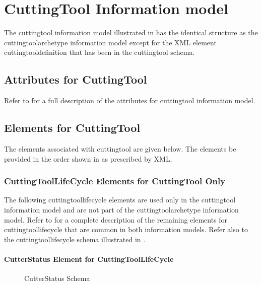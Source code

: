 \section{CuttingTool Information model}
The \gls{cuttingtool} \gls{information model} illustrated in  has the identical structure as the \gls{cuttingtoolarchetype} \gls{information model} except for the XML element \gls{cuttingtooldefinition} that has been \DEPRECATED in the \gls{cuttingtool} schema.

\subsection{Attributes for CuttingTool}
Refer to  for a full description of the \glspl{attribute} for \gls{cuttingtool} \gls{information model}.

\subsection{Elements for CuttingTool}
The elements associated with \gls{cuttingtool} are given below.    The elements \MUST be provided in the order shown in  as prescribed by XML.



\subsubsection{CuttingToolLifeCycle Elements for CuttingTool Only}

The following \gls{cuttingtoollifecycle} elements are used only in the \gls{cuttingtool} \gls{information model} and are not part of the \gls{cuttingtoolarchetype} \gls{information model}. Refer to  for a complete description of the remaining elements for \gls{cuttingtoollifecycle} that are common in both \glspl{information model}.  Refer also to the \gls{cuttingtoollifecycle} schema illustrated in .

\paragraph{CutterStatus Element for CuttingToolLifeCycle}\mbox{}

\begin{figure}[ht]
  \centering
  \caption{CutterStatus Schema}
  \label{fig:cutterstatus-schema}
\end{figure}

